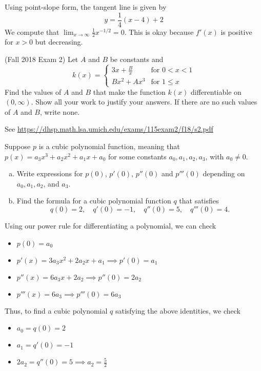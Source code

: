 \documentclass[11pt]{exam}
\begin{document}
\begin{questions}
\begin{solution}
    Using point-slope form, the tangent line is
    given by \[
      y = \frac{1}{4}(x-4)+2
    \]
    We compute that \(\lim_{x \to \infty} \frac{1}{2}x^{-1/2} =
    0\). This is okay because \(f'(x)\) is positive for \(x > 0\) but
    decreasing. 
  \end{solution}
\question (Fall 2018 Exam 2) Let \(A\) and \(B\) be constants and \[
    k(x) =
    \begin{cases}
      3x+\frac{B}{x} & \text{for }0 < x < 1\\
      Bx^2+Ax^3 & \text{for } 1 \leq x
    \end{cases}
  \]
  Find the values of \(A\) and \(B\) that make the function \(k(x)\) differentiable on \((0, \infty)\). Show all your
work to justify your answers. If there are no such values of \(A\) and \(B\), write none.
\begin{solution}
  See \href{https://dhsp.math.lsa.umich.edu/exams/115exam2/f18/s2.pdf}{https://dhsp.math.lsa.umich.edu/exams/115exam2/f18/s2.pdf}
\end{solution}
\question Suppose $p$ is a cubic polynomial function, meaning that $p(x) = a_3x^3 +a_2x^2 +a_1x+a_0$
for some constants $a_0, a_1, a_2, a_3$, with $a_0 \neq 0$.
\begin{enumerate}[(a)]
\item Write expressions for $p(0)$, $p'(0)$, $p''(0)$ and $p'''(0)$ depending on $a_0, a_1, a_2$, and $a_3$.
\item Find the formula for a cubic polynomial function $q$ that satisfies
\[
q(0) = 2, \quad q'(0) = -1, \quad q''(0) = 5, \quad q'''(0) = 4.
\]
\end{enumerate}
\begin{solution}
  Using our power rule for differentiating a polynomial, we can check
  \begin{itemize}
  \item \(p(0) = a_0\)
  \item \(p'(x) = 3 a_3 x^2 + 2 a_2 x + a_1 \implies p'(0) = a_1\) 
  \item \(p''(x) = 6 a_3 x + 2 a_2 \implies p''(0) = 2 a_2\)
  \item \(p'''(x) = 6 a_3 \implies p'''(0) = 6 a_3\)
  \end{itemize}
  Thus, to find a cubic polynomial \(q\) satisfying the above
  identities, we check
  \begin{itemize}
  \item \(a_0 = q(0) = 2\)
  \item \(a_1 = q'(0) = -1\)
  \item \(2 a_2 = q''(0) = 5 \implies a_2 = \frac{5}{2}\)

\end{itemize}
\end{solution}
\end{questions}
\end{document}
